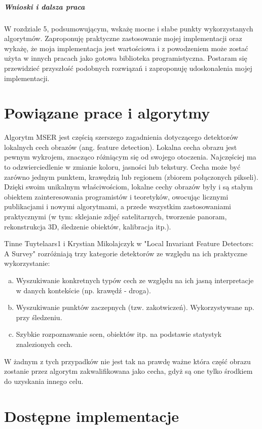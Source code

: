\subparagraph{Wnioski i dalsza praca}

W rozdziale 5, podsumowującym, wskażę mocne i słabe punkty wykorzystanych
algorytmów. Zaproponuję praktyczne zastosowanie mojej implementacji oraz
wykażę, że moja implementacja jest wartościowa i z powodzeniem może zostać
użyta w innych pracach jako gotowa biblioteka programistyczna. Postaram się
przewidzieć przyszłość podobnych rozwiązań i zaproponuję udoskonalenia mojej
implementacji.

\section{Powiązane prace i algorytmy}

Algorytm MSER jest częścią szerszego zagadnienia dotyczącego detektorów
lokalnych cech obrazów (ang. feature detection). Lokalna cecha obrazu jest
pewnym wykrojem, znacząco różniącym się od swojego otoczenia.  Najczęściej ma
to odzwierciedlenie w zmianie koloru, jasności lub tekstury.  Cecha może być
zarówno jednym punktem, krawędzią lub regionem (zbiorem połączonych pikseli).
Dzięki swoim unikalnym właściwościom, lokalne cechy obrazów były i są stałym
obiektem zainteresowania programistów i teoretyków, owocując licznymi
publikacjami i nowymi algorytmami, a przede wszystkim zastosowaniami
praktycznymi (w tym: sklejanie zdjęć satelitarnych, tworzenie panoram,
rekonstrukcja 3D, śledzenie obiektów, kalibracja itp.).

Tinne Tuytelaars1 i Krystian Mikolajczyk w "Local Invariant Feature Detectors:
A Survey" \cite{survey} rozróżniają trzy kategorie detektorów ze względu na
ich praktyczne wykorzystanie: \begin{enumerate}[a)] \item Wyszukiwanie
konkretnych typów cech ze względu na ich jasną interpretacje w danych
kontekście (np. krawędź - droga). \item Wyszukiwanie punktów zaczepnych (tzw.
zakotwiczeń). Wykorzystywane np. przy śledzeniu. \item Szybkie rozpoznawanie
scen, obiektów itp. na podstawie statystyk znalezionych cech. \end{enumerate} W
żadnym z tych przypadków nie jest tak na prawdę ważne która część obrazu
zostanie przez algorytm zakwalifikowana jako cecha, gdyż są one tylko środkiem
do uzyskania innego celu.


\section{Dostępne implementacje}

